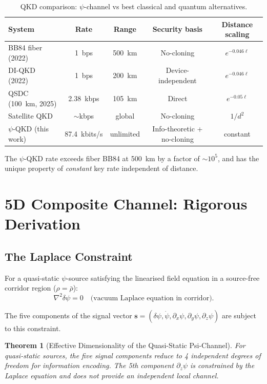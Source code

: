 \documentclass[aps,prd,twocolumn,superscriptaddress,nofootinbib]{revtex4-2}
\newtheorem{theorem}{Theorem}
\begin{document}
\begin{table}[t]
\centering
\caption{QKD comparison: $\psi$-channel vs best classical and quantum alternatives.}
\begin{tabular}{lcccc}
\hline\hline
System & Rate & Range & Security basis & Distance scaling \\
\hline
BB84 fiber (2022) & 1~bps & 500~km & No-cloning & $e^{-0.046\ell}$ \\
DI-QKD (2022) & 1~bps & 200~km & Device-independent & $e^{-0.046\ell}$ \\
QSDC (100~km, 2025) & 2.38~kbps & 105~km & Direct & $e^{-0.05\ell}$ \\
Satellite QKD & $\sim$kbps & global & No-cloning & $1/d^2$ \\
$\psi$-QKD (this work) & 87.4~kbits/s & unlimited & Info-theoretic + no-cloning & constant \\
\hline\hline
\end{tabular}
\label{tab:qkd}
\end{table}

The $\psi$-QKD rate exceeds fiber BB84 at 500~km by a factor of $\sim 10^5$,
and has the unique property of \emph{constant} key rate independent of
distance.

\section{5D Composite Channel: Rigorous Derivation}
\label{sec:5D}

\subsection{The Laplace Constraint}

For a quasi-static $\psi$-source satisfying the linearised field equation
in a source-free corridor region ($\rho = \bar\rho$):
\begin{equation}
\nabla^2\delta\psi = 0 \quad\text{(vacuum Laplace equation in corridor)}.
\label{eq:laplace-corridor}
\end{equation}

The five components of the signal vector
$\mathbf{s} = (\delta\psi, \dot\psi, \partial_x\psi, \partial_y\psi, \partial_z\psi)$
are subject to this constraint.

\begin{theorem}[Effective Dimensionality of the Quasi-Static Psi-Channel]
\label{thm:4D}
For quasi-static sources, the five signal components reduce to
\emph{4 independent degrees of freedom} for information encoding.
The 5th component $\partial_z\psi$ is constrained by the Laplace
equation and does not provide an independent local channel.
\end{theorem}
\end{document}
